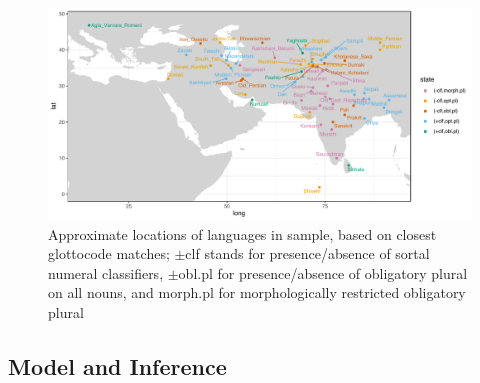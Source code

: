 \documentclass[11pt]{article}
\begin{document}
\begin{figure}
\centering
%
\includegraphics[width=.95\linewidth]{code/lang_map.pdf}
\caption{Approximate locations of languages in sample, based on closest glottocode matches; {\sc $\pm$clf} stands for presence/absence of sortal numeral classifiers, {\sc $\pm$obl.pl} for presence/absence of obligatory plural on all nouns, and {\sc morph.pl} for morphologically restricted obligatory plural}
\label{map}
\end{figure}


\subsection{Model and Inference}
\end{document}
